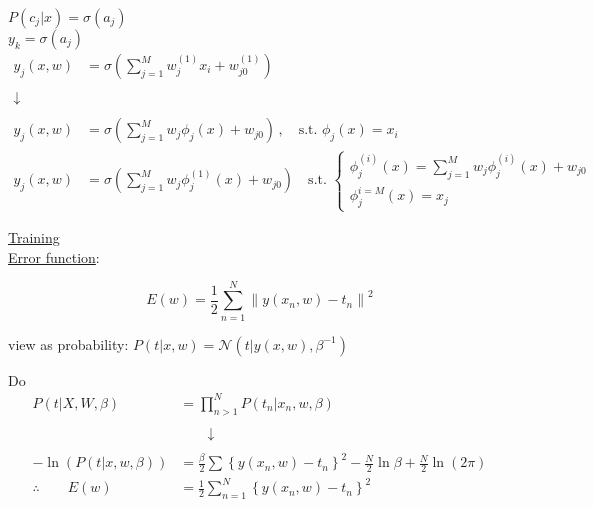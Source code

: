 $P(c_j|x)=\sigma(a_j)$\\
$y_k = \sigma(a_j)$\\

\begin{align*}
y_j( x, w ) & = \sigma\left( \sum_{j=1}^{M} w_j^{(1)} x_i + w^{(1)}_{j0}\right) \\
\\
\downarrow & \\
\\
y_j( x, w ) & = \sigma\left( \sum_{j=1}^{M} w_j \phi_j(x)+w_{j0} \right)\,,\quad \text{s.t.\ }\phi_j(x)=x_i\\
y_j( x, w ) & = \sigma\left( \sum_{j=1}^{M}w_j\phi_j^{(1)}(x) +w_{j0} \right) \quad \text{s.t.\ } \left\{ \begin{array}{c} \phi_j^{(i)}(x) = \sum_{j=1}^{M} w_j\phi_j^{(i)}(x)+w_{j0} \\ \phi_j^{i=M}(x) = x_j \end{array}\right. 
\end{align*}

\newpage

\underline{Training}\\

\underline{Error function}:

\begin{equation*}
E(w)  = \frac{1}{2} \sum_{n=1}^{N}\left\lVert y(x_n,w) - t_n \right\rVert^2
\end{equation*}

view as probability: $P(t|x,w)=\mathcal{N}(t|y(x,w),\beta^{-1})$

Do
\begin{align*}
P( t|X, W, \beta ) & = \prod_{ n>1 }^{N} P( t_n|x_n, w, \beta ) \\
\\
& \qquad \downarrow \\
\\
-\ln\left( P( t|x, w, \beta )\right) & = \frac{\beta}{2}\sum \left\{ y( x_n, w ) - t_n \right\}^2 -\frac{N}{2}\ln \beta + \frac{N}{2}\ln(2\pi) \\
\therefore\qquad E(w) & = \frac{1}{2} \sum_{n=1}^{N} \left\{ y( x_n, w ) - t_n \right\}^2
\end{align*}

\begin{center}
\end{center}

